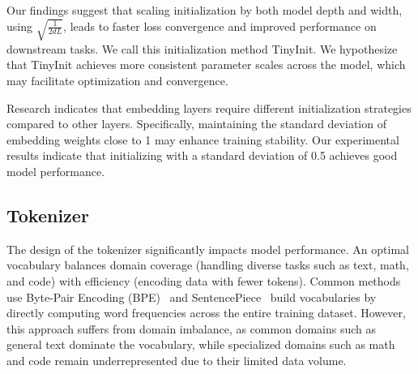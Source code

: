 Our findings suggest that scaling initialization by both model depth and width, using $ \sqrt{\frac{1}{2dL}}$, leads to faster loss convergence and improved performance on downstream tasks. We call this initialization method TinyInit.
We hypothesize that TinyInit achieves more consistent parameter scales across the model, which may facilitate optimization and convergence. 

Research \cite{takase2024spikemore} indicates that embedding layers require different initialization strategies compared to other layers.
Specifically, maintaining the standard deviation of embedding weights close to 1 may enhance training stability. 
Our experimental results indicate that initializing with a standard deviation of 0.5 achieves good model performance.



\subsection{Tokenizer}\label{section:tokenizer}
The design of the tokenizer significantly impacts model performance. An optimal vocabulary balances domain coverage (handling diverse tasks such as text, math, and code) with efficiency (encoding data with fewer tokens). Common methods use Byte-Pair Encoding (BPE)~\cite{shibata1999byte} and SentencePiece~\cite{kudo-richardson-2018-sentencepiece} build vocabularies by directly computing word frequencies across the entire training dataset. However, this approach suffers from domain imbalance, as common domains such as general text dominate the vocabulary, while specialized domains such as math and code remain underrepresented due to their limited data volume.



